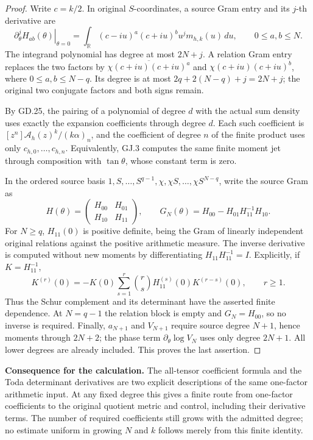 \begin{proof}
Write \(c=k/2\). In original \(S\)-coordinates, a source Gram entry
and its \(j\)-th derivative are
\[
\left.\partial_\theta^j H_{ab}(\theta)\right|_{\theta=0}
 =\int_{\mathbb R}(c-iu)^a(c+iu)^b u^j m_{h,k}(u)\,du,
 \qquad 0\leq a,b\leq N. \tag{GJ.6}
\]
The integrand polynomial has degree at most \(2N+j\).
A relation Gram entry replaces the two factors by
\(\overline{\chi(c+iu)(c+iu)^a}\) and
\(\chi(c+iu)(c+iu)^b\), where \(0\leq a,b\leq N-q\).
Its degree is at most \(2q+2(N-q)+j=2N+j\); the original two conjugate
factors and both signs remain.

By GD.25, the pairing of a polynomial of degree \(d\) with the actual
sum density uses exactly the expansion coefficients through degree
\(d\). Each such coefficient is
\([z^n]\mathcal A_h(z)^k/(k\alpha)_n\), and the coefficient of degree
\(n\) of the finite product uses only \(c_{h,0},\ldots,c_{h,n}\).
Equivalently, GJ.3 computes the same finite moment jet through composition
with \(\tan\theta\), whose constant term is zero.

In the ordered source basis
\(1,S,\ldots,S^{q-1},\chi,\chi S,\ldots,\chi S^{N-q}\),
write the source Gram as
\[
H(\theta)=\begin{pmatrix}H_{00}&H_{01}\\H_{10}&H_{11}\end{pmatrix},
\qquad
G_N(\theta)=H_{00}-H_{01}H_{11}^{-1}H_{10}. \tag{GJ.7}
\]
For \(N\geq q\), \(H_{11}(0)\) is positive definite, being the Gram
of linearly independent original relations against the positive
arithmetic measure. The inverse derivative is computed without new
moments by differentiating \(H_{11}H_{11}^{-1}=I\). Explicitly, if
\(K=H_{11}^{-1}\),
\[
K^{(r)}(0)=-K(0)\sum_{s=1}^r\binom rs
 H_{11}^{(s)}(0)K^{(r-s)}(0),\qquad r\geq1. \tag{GJ.8}
\]
Thus the Schur complement and its determinant have the asserted finite
dependence. At \(N=q-1\) the relation block is empty and \(G_N=H_{00}\),
so no inverse is required. Finally, \(a_{N+1}\) and \(V_{N+1}\) require
source degree \(N+1\), hence moments through \(2N+2\); the phase term
\(\partial_\theta\log V_N\) uses only degree \(2N+1\).
All lower degrees are already included. This proves the last assertion.
\end{proof}

\textbf{Consequence for the calculation.}
The all-tensor coefficient formula and the Toda determinant derivatives
are two explicit descriptions of the same one-factor arithmetic input.
At any fixed degree this gives a finite route from one-factor coefficients
to the original quotient metric and control, including their derivative
terms. The number of required coefficients still grows with the admitted
degree; no estimate uniform in growing \(N\) and \(k\) follows merely
from this finite identity.

